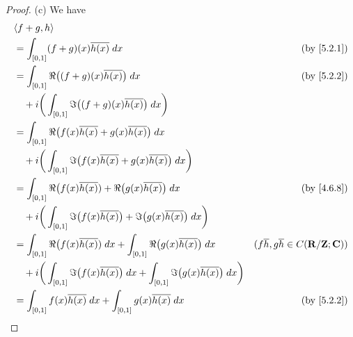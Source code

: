 \begin{proof}{(c)}
  We have
  \begin{align*}
     & \inner*{f + g, h}                                                                                                                                                                          \\
     & = \int_{[0, 1]} (f + g)(x) \overline{h(x)} \; dx                                                                                    & \text{(by \cref{5.2.1})}                             \\
     & = \int_{[0, 1]} \Re\big((f + g)(x) \overline{h(x)}\big) \; dx                                                                       & \text{(by \cref{5.2.2})}                             \\
     & \quad + i \bigg(\int_{[0, 1]} \Im\big((f + g)(x) \overline{h(x)}\big) \; dx\bigg)                                                                                                          \\
     & = \int_{[0, 1]} \Re\big(f(x) \overline{h(x)} + g(x) \overline{h(x)}\big) \; dx                                                                                                             \\
     & \quad + i \bigg(\int_{[0, 1]} \Im\big(f(x) \overline{h(x)} + g(x) \overline{h(x)}\big) \; dx\bigg)                                                                                         \\
     & = \int_{[0, 1]} \Re\big(f(x) \overline{h(x)}) + \Re\big(g(x) \overline{h(x)}\big) \; dx                                             & \text{(by \cref{4.6.8})}                             \\
     & \quad + i \bigg(\int_{[0, 1]} \Im\big(f(x) \overline{h(x)}\big) + \Im\big(g(x) \overline{h(x)}\big) \; dx\bigg)                                                                            \\
     & = \int_{[0, 1]} \Re\big(f(x) \overline{h(x)}) \; dx + \int_{[0, 1]} \Re\big(g(x) \overline{h(x)}\big) \; dx                         & (f \overline{h}, g \overline{h} \in C(\R / \Z ; \C)) \\
     & \quad + i \bigg(\int_{[0, 1]} \Im\big(f(x) \overline{h(x)}\big) \; dx + \int_{[0, 1]} \Im\big(g(x) \overline{h(x)}\big) \; dx\bigg)                                                        \\
     & = \int_{[0, 1]} f(x) \overline{h(x)} \; dx + \int_{[0, 1]} g(x) \overline{h(x)} \; dx                                               & \text{(by \cref{5.2.2})}                             \\

\end{align*}
\end{proof}
